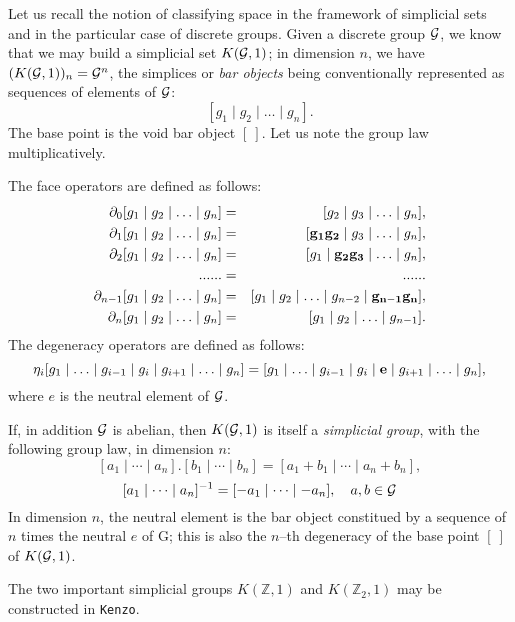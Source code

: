Let us recall the notion of classifying space in the framework of simplicial sets and
in the particular case of discrete groups. Given a discrete group $\cal G$, we know that we may build a
simplicial set $K({\cal G}, 1)$; in dimension $n$, we have $(K({\cal G}, 1))_n = {\cal G}^n$,
the simplices or {\em bar objects} being  conventionally represented  as sequences of elements of $\cal G$:
$$ [g_1 \mid g_2 \mid \ldots \mid g_n]. $$
The base point is the void bar object $[\ ]$.
Let us note the group law multiplicatively.
\par
The face operators are defined as follows:
\begin{eqnarray*}
\partial_0 [g_1 \mid g_2 \mid \ldots \mid g_n] & = & [g_2 \mid g_3 \mid \ldots \mid g_n], \\
\partial_1 [g_1 \mid g_2 \mid \ldots \mid g_n] & = & [{\bf g_1g_2} \mid g_3 \mid \ldots \mid g_n], \\
\partial_2 [g_1 \mid g_2 \mid \ldots \mid g_n] & = & [g_1 \mid {\bf g_2g_3} \mid \ldots \mid g_n], \\
                        ......                & = &  ......  \\
\partial_{n-1} [g_1 \mid g_2 \mid \ldots \mid g_n] & = & [g_1 \mid g_2 \mid \ldots \mid g_{n-2} \mid {\bf g_{n-1}g_n}], \\
\partial_n [g_1 \mid g_2 \mid \ldots \mid g_n] & = & [g_1 \mid g_2 \mid \ldots \mid g_{n-1}].
\end{eqnarray*}
The degeneracy operators are defined as follows:
$$ \eta_i [g_1 \mid \ldots \mid g_{i-1} \mid g_i \mid g_{i+1} \mid \ldots \mid g_n] =
          [g_1 \mid \ldots \mid g_{i-1}  \mid g_i \mid {\bf e} \mid g_{i+1} \mid \ldots \mid g_n],$$
where $e$ is the neutral element of $\cal G$.
\par
If, in addition $\cal G$ is abelian, then  $K({\cal G}, 1)$ is itself a {\em simplicial group}, with the
following group law, in dimension $n$:
$$[a_1  \mid \cdots \mid a_n] . [b_1 \mid \cdots \mid b_n] = [a_1+b_1 \mid \cdots \mid a_n+b_n], $$
$$[a_1  \mid \cdots \mid a_n]^{-1}= [-a_1  \mid \cdots \mid -a_n],\quad a,b \in {\cal G}$$
In dimension $n$, the neutral element is the bar object constitued by a sequence of $n$ times the neutral $e$ of {\cal G};
this is also the $n$--th degeneracy of the base point $[\ ]$ of $K({\cal G}, 1)$.
\par
The two important simplicial groups $K(\mathbb{Z}, 1)$ and $K(\mathbb{Z}_2, 1)$ may be cons\-truc\-ted in {\tt Kenzo}.
\vskip 0.30cm
